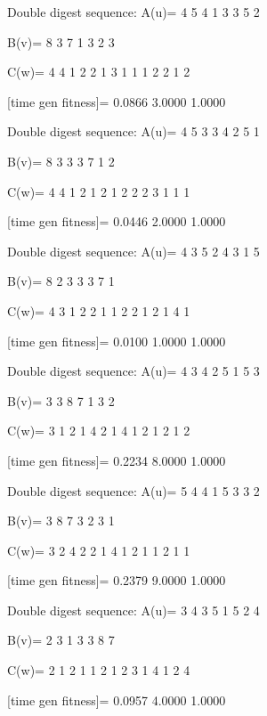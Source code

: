 Double digest sequence:
A(u)=
     4     5     4     1     3     3     5     2

B(v)=
     8     3     7     1     3     2     3

C(w)=
     4     4     1     2     2     1     3     1     1     1     2     2     1     2

[time gen fitness]=
    0.0866    3.0000    1.0000

Double digest sequence:
A(u)=
     4     5     3     3     4     2     5     1

B(v)=
     8     3     3     3     7     1     2

C(w)=
     4     4     1     2     1     2     1     2     2     2     3     1     1     1

[time gen fitness]=
    0.0446    2.0000    1.0000

Double digest sequence:
A(u)=
     4     3     5     2     4     3     1     5

B(v)=
     8     2     3     3     3     7     1

C(w)=
     4     3     1     2     2     1     1     2     2     1     2     1     4     1

[time gen fitness]=
    0.0100    1.0000    1.0000

Double digest sequence:
A(u)=
     4     3     4     2     5     1     5     3

B(v)=
     3     3     8     7     1     3     2

C(w)=
     3     1     2     1     4     2     1     4     1     2     1     2     1     2

[time gen fitness]=
    0.2234    8.0000    1.0000

Double digest sequence:
A(u)=
     5     4     4     1     5     3     3     2

B(v)=
     3     8     7     3     2     3     1

C(w)=
     3     2     4     2     2     1     4     1     2     1     1     2     1     1

[time gen fitness]=
    0.2379    9.0000    1.0000

Double digest sequence:
A(u)=
     3     4     3     5     1     5     2     4

B(v)=
     2     3     1     3     3     8     7

C(w)=
     2     1     2     1     1     2     1     2     3     1     4     1     2     4

[time gen fitness]=
    0.0957    4.0000    1.0000

